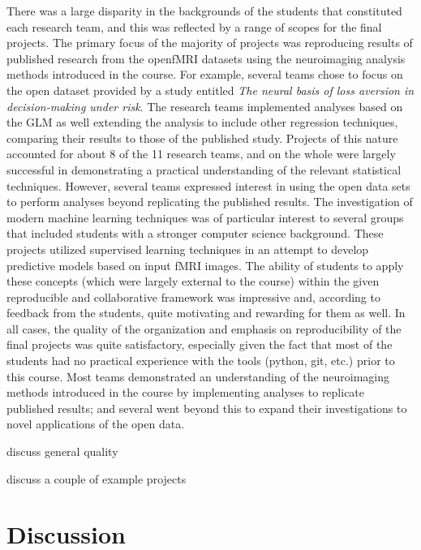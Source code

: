 There was a large disparity in the backgrounds of the students that constituted 
each research team, and this was reflected by a range of scopes for the
final projects.
The primary focus of the majority of projects was reproducing results
of published research from the openfMRI datasets using the neuroimaging 
analysis methods introduced in the course.
For example, several teams chose to focus on the open dataset provided by a
study entitled \textit{The neural basis of loss aversion in decision-making
under risk}\cite{tom2007neutral}.
The research teams implemented analyses based on the GLM as well extending
the analysis to include other regression techniques, comparing their results
to those of the published study.
Projects of this nature accounted for about 8 of the 11 research teams, and
on the whole were largely successful in demonstrating a practical understanding
of the relevant statistical techniques.
However, several teams expressed interest in using the open data sets to 
perform analyses beyond replicating the published results.
The investigation of modern machine learning techniques was of particular 
interest to several groups that included students with a stronger computer
science background.
These projects utilized supervised learning techniques in an attempt to 
develop predictive models based on input fMRI images.
The ability of students to apply these concepts (which were largely external
to the course) within the given reproducible and collaborative 
framework was impressive and, according to feedback from the students, quite
motivating and rewarding for them as well.
In all cases, the quality of the organization and emphasis on reproducibility
of the final projects was quite satisfactory, especially given the fact that
most of the students had no practical experience with the tools (python, git,
etc.) prior to this course.
Most teams demonstrated an understanding of the neuroimaging methods introduced
in the course by implementing analyses to replicate published results; and 
several went beyond this to expand their investigations to novel applications
of the open data.


discuss general quality

discuss a couple of example projects
\citep{tom2007neural}

\section{Discussion}\label{discussion}

